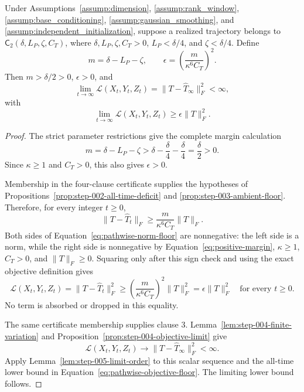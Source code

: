 \begin{proposition}
\label{prop:step-005-pathwise-closure}
Under Assumptions~\ref{assump:dimension}, \ref{assump:rank_window},
\ref{assump:base_conditioning}, \ref{assump:gaussian_smoothing}, and
\ref{assump:independent_initialization}, suppose a realized trajectory
belongs to $\mathsf C_2(\delta,L_P,\zeta,C_T)$, where
$\delta,L_P,\zeta,C_T>0$, $L_P<\delta/4$, and
$\zeta<\delta/4$.  Define
\[
m=\delta-L_P-\zeta,
\qquad
\epsilon=\left(\frac{m}{\kappa^6C_T}\right)^2.
\]
Then $m>\delta/2>0$, $\epsilon>0$, and
\[
\lim_{t\to\infty}\mathcal L(X_t,Y_t,Z_t)
=\|T-\widehat T_\infty\|_F^2<\infty,
\]
with
\[
\lim_{t\to\infty}\mathcal L(X_t,Y_t,Z_t)
\geq\epsilon\|T\|_F^2.
\]
\end{proposition}

\begin{proof}
The strict parameter restrictions give the complete margin calculation
\begin{equation}
m
=\delta-L_P-\zeta
>\delta-\frac{\delta}{4}-\frac{\delta}{4}
=\frac{\delta}{2}>0.
\label{eq:positive-margin}
\end{equation}
Since $\kappa\geq1$ and $C_T>0$, this also gives $\epsilon>0$.

Membership in the four-clause certificate supplies the hypotheses of
Propositions~\ref{prop:step-002-all-time-deficit} and
\ref{prop:step-003-ambient-floor}.  Therefore, for every integer $t\geq0$,
\begin{equation}
\|T-\widehat T_t\|_F
\geq\frac{m}{\kappa^6C_T}\|T\|_F.
\label{eq:pathwise-norm-floor}
\end{equation}
Both sides of Equation~\eqref{eq:pathwise-norm-floor} are nonnegative: the
left side is a norm, while the right side is nonnegative by
Equation~\eqref{eq:positive-margin}, $\kappa\geq1$, $C_T>0$, and
$\|T\|_F\geq0$.  Squaring only after this sign check and using the exact
objective definition gives
\begin{equation}
\mathcal L(X_t,Y_t,Z_t)
=\|T-\widehat T_t\|_F^2
\geq
\left(\frac{m}{\kappa^6C_T}\right)^2\|T\|_F^2
=\epsilon\|T\|_F^2
\quad\text{for every }t\geq0.
\label{eq:pathwise-objective-floor}
\end{equation}
No term is absorbed or dropped in this equality.

The same certificate membership supplies clause 3.
Lemma~\ref{lem:step-004-finite-variation} and
Proposition~\ref{prop:step-004-objective-limit} give
\[
\mathcal L(X_t,Y_t,Z_t)
\longrightarrow\|T-\widehat T_\infty\|_F^2<\infty.
\]
Apply Lemma~\ref{lem:step-005-limit-order} to this scalar sequence and the
all-time lower bound in Equation~\eqref{eq:pathwise-objective-floor}.  The
limiting lower bound follows.


\end{proof}
